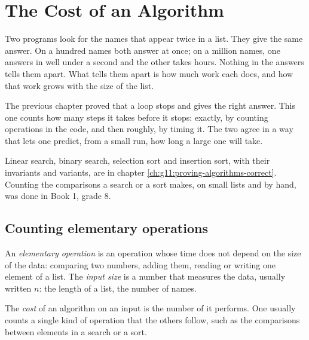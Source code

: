 \chapter{The Cost of an Algorithm}\label{ch:g11:cost-of-an-algorithm}

Two programs look for the names that appear twice in a list. They give the same answer. On a hundred names both
answer at once; on a million names, one answers in well under a second and the other takes hours. Nothing in the
answers tells them apart. What tells them apart is how much work each does, and how that work grows with the size of
the list.

The previous chapter proved that a loop stops and gives the right answer. This one counts how many steps it takes
before it stops: exactly, by counting operations in the code, and then roughly, by timing it. The two agree in a way
that lets one predict, from a small run, how long a large one will take.

\begin{recall}
Linear search, binary search, selection sort and insertion sort, with their invariants and variants, are in chapter
\ref{ch:g11:proving-algorithms-correct}. Counting the comparisons a search or a sort makes, on small lists and by
hand, was done in Book 1, grade 8.
\end{recall}

\section{Counting elementary operations}\label{sec:g11:cost-of-an-algorithm:counting}

\begin{definition}\label{def:g11:cost-of-an-algorithm:elementary}
An \emph{elementary operation} is an operation whose time does not depend on the size of
the data: comparing two numbers, adding them, reading or writing one element of a list. The \emph{input
size} is a number that measures the data, usually written $n$: the length of a list, the number of
names.
\end{definition}

\begin{definition}[Cost]\label{def:g11:cost-of-an-algorithm:cost}
The \emph{cost} of an algorithm on an input is the number of  it
performs. One usually counts a single kind of operation that the others follow, such as the comparisons between
elements in a search or a sort.
\end{definition}

